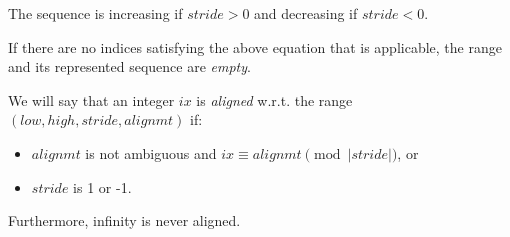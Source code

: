 The sequence is increasing if $stride > 0$ and decreasing if $stride < 0$.

If there are no indices satisfying the above equation that is applicable,
the range and its represented sequence are \emph{empty}.

We will say that an integer $ix$ is \emph{aligned}
w.r.t. the range $(low, high, stride, alignmt)$
if:
\begin{itemize}
\item $alignmt$ is not ambiguous and $ix \equiv alignmt \pmod{|stride|}$, or
\item $stride$ is 1 or -1.
\end{itemize}
\noindent Furthermore, infinity is never aligned.


